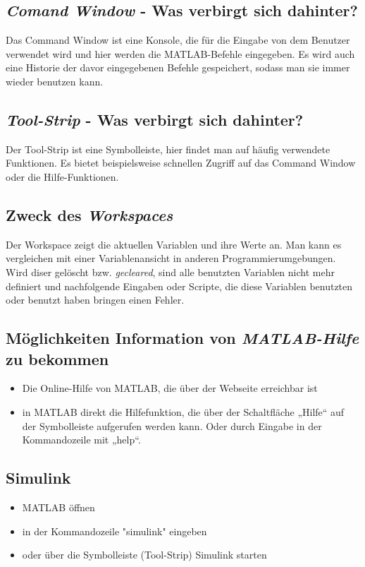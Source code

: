 \documentclass{article}
\begin{document}
		\subsection{\textit{Comand Window} - Was verbirgt sich dahinter?}
			Das Command Window ist eine Konsole, die für die Eingabe von dem Benutzer verwendet wird und hier werden die MATLAB-Befehle eingegeben. Es wird auch eine Historie der davor eingegebenen Befehle gespeichert, sodass man sie immer wieder benutzen kann.
			
		\subsection{\textit{Tool-Strip} - Was verbirgt sich dahinter?}
			Der Tool-Strip ist eine Symbolleiste, hier findet man auf häufig verwendete Funktionen. Es bietet beispielsweise schnellen Zugriff auf das Command Window oder die Hilfe-Funktionen. 
		
		\subsection{Zweck des \textit{Workspaces}}
			Der Workspace zeigt die aktuellen Variablen und ihre Werte an. Man kann es vergleichen mit einer Variablenansicht in anderen Programmierumgebungen. Wird diser gelöscht bzw. \textit{gecleared}, sind alle benutzten Variablen nicht mehr definiert und nachfolgende Eingaben oder Scripte, die diese Variablen benutzten oder benutzt haben bringen einen Fehler.
		
		\subsection{Möglichkeiten Information von \textit{MATLAB-Hilfe} zu bekommen}
			\begin{itemize}
				\item Die Online-Hilfe von MATLAB, die über der Webseite erreichbar ist 
				\item in MATLAB direkt die Hilfefunktion, die über der Schaltfläche „Hilfe“ auf der Symbolleiste aufgerufen werden kann. Oder durch Eingabe in der Kommandozeile mit „help“. 
			\end{itemize}
		
		\subsection{Simulink}
			\begin{itemize}
				\item MATLAB öffnen
				\item in der Kommandozeile "simulink" eingeben
				\item oder über die Symbolleiste (Tool-Strip) Simulink starten
			\end{itemize}
		
\end{document}
